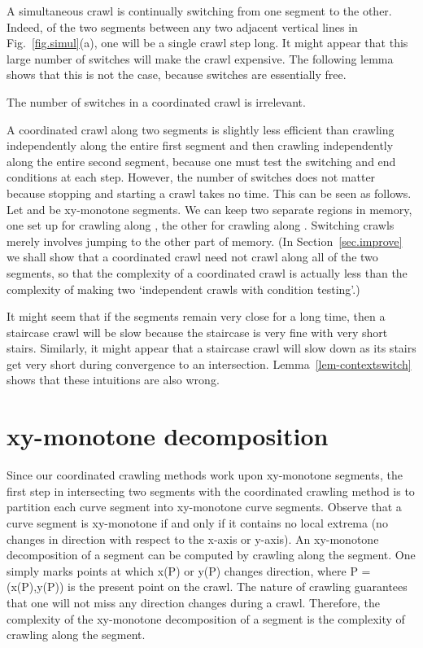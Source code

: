 A simultaneous crawl is continually switching from one segment to the other.
Indeed, of the two segments between any two adjacent vertical lines
in Fig.~\ref{fig.simul}(a), one will be a single crawl step long.
It might appear that this large number of switches will make the crawl expensive.
The following lemma shows that this is not the case, because switches are essentially free.

\begin{lemma}
\label{lem-contextswitch}
The number of switches in a coordinated crawl is irrelevant.
\end{lemma}
A coordinated crawl along two segments is slightly less efficient than
crawling independently along the entire first segment and then crawling 
independently along the entire second segment, because one must test
the switching and end conditions at each step.
However, the number of switches does not matter because 
stopping and starting a crawl takes no time.
This can be seen as follows.
Let  and  be xy-monotone segments.
We can keep two separate regions in memory, one set up for crawling
along , the other for crawling along .
Switching crawls merely involves jumping to the other part of memory. 
(In Section~\ref{sec.improve} we shall show that a coordinated crawl need not crawl along 
all of the two segments,
so that the complexity of a coordinated crawl is actually less than the complexity of making two 
`independent crawls with condition testing'.)
\QED

It might seem that if the segments remain very close for a long time, then a 
staircase crawl will be slow because the staircase is very fine with very short stairs. 
Similarly, it might appear that a staircase crawl will slow down as its stairs 
get very short during convergence to an intersection.
Lemma~\ref{lem-contextswitch} shows that these intuitions are also wrong.

\section{xy-monotone decomposition}
\label{sec-decomp}

Since our coordinated crawling methods work upon xy-monotone segments,
the first step in intersecting two segments with the coordinated crawling method is to
partition each curve segment into xy-monotone curve segments.
Observe that a curve segment is xy-monotone if and only if it contains 
no local extrema (no changes in direction with respect to the x-axis or y-axis).
An xy-monotone decomposition of a segment can be computed by crawling along the segment.
One simply marks points at which x(P) or y(P) changes direction,
where P = (x(P),y(P)) is the present point on the crawl.
The nature of crawling guarantees that one will not miss any direction changes during a crawl.
Therefore, the complexity of the xy-monotone decomposition of a segment is the
complexity of crawling along the segment.

